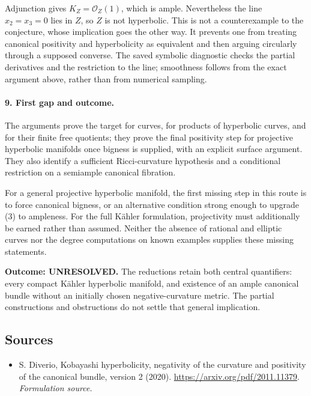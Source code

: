 \documentclass[11pt]{article}
\begin{document}
Adjunction gives $K_Z=\mathcal O_Z(1)$, which is ample. Nevertheless the line $x_2=x_3=0$ lies in $Z$, so $Z$ is not hyperbolic. This is not a counterexample to the conjecture, whose implication goes the other way. It prevents one from treating canonical positivity and hyperbolicity as equivalent and then arguing circularly through a supposed converse. The saved symbolic diagnostic checks the partial derivatives and the restriction to the line; smoothness follows from the exact argument above, rather than from numerical sampling.

\paragraph{9. First gap and outcome.}
The arguments prove the target for curves, for products of hyperbolic curves, and for their finite free quotients; they prove the final positivity step for projective hyperbolic manifolds once bigness is supplied, with an explicit surface argument. They also identify a sufficient Ricci-curvature hypothesis and a conditional restriction on a semiample canonical fibration.

For a general projective hyperbolic manifold, the first missing step in this route is to force canonical bigness, or an alternative condition strong enough to upgrade (3) to ampleness. For the full K\"ahler formulation, projectivity must additionally be earned rather than assumed. Neither the absence of rational and elliptic curves nor the degree computations on known examples supplies these missing statements.

\textbf{Outcome: UNRESOLVED.} The reductions retain both central quantifiers: every compact K\"ahler hyperbolic manifold, and existence of an ample canonical bundle without an initially chosen negative-curvature metric. The partial constructions and obstructions do not settle that general implication.

\subsection{Sources}
\begin{itemize}
\item[S1]S. Diverio, Kobayashi hyperbolicity, negativity of the curvature and positivity of the canonical bundle, version 2 (2020).
\url{https://arxiv.org/pdf/2011.11379}.
\textit{Formulation source.}
\end{itemize}
\end{document}
